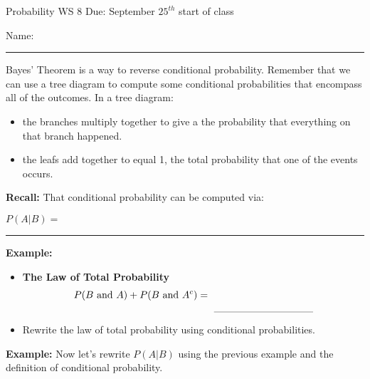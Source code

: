 \documentclass[oneside]{amsart}
\theoremstyle{definition}
\theoremstyle{definition}
\begin{document}
Probability \hfill {\huge WS 8} \hfill Due: September $25^{th}$ start of class \\
\begin{flushright}
    {\Large Name:}\rule[-1mm]{75mm}{.1mm}
\end{flushright}

 \hrulefill
\vspace{2mm}

Bayes' Theorem is a way to reverse conditional probability. Remember that we can use a tree diagram to compute some conditional probabilities that encompass all of the outcomes. In a tree diagram:

\begin{itemize}
    \item the branches multiply together to give a the probability that everything on that branch happened.
    \item the leafs add together to equal 1, the total probability that one of the events occurs. 
\end{itemize}

\begin{ovalbox}{\begin{minipage}{6.8in}
\vspace{5mm}

\textbf{Recall:} That conditional probability can be computed via:\\
\begin{center}
  $P(A|B) =$ \rule[-5mm]{35mm}{.1mm}
\end{center}

\end{minipage}}
\end{ovalbox}

\vspace{3mm}
\textbf{Example:}

\begin{itemize} 
    \item \textbf{The Law of Total Probability} 
    \begin{align*}
        P(B \text{ and } A) + P(B \text{ and } A^c) = \text{ \rule[-5mm]{35mm}{.1mm}}
    \end{align*} 
\item Rewrite the law of total probability using conditional probabilities.
\end{itemize}


\vfill

\textbf{Example:} Now let's rewrite $P(A|B)$ using the previous example and the definition of conditional probability.
\end{document}
